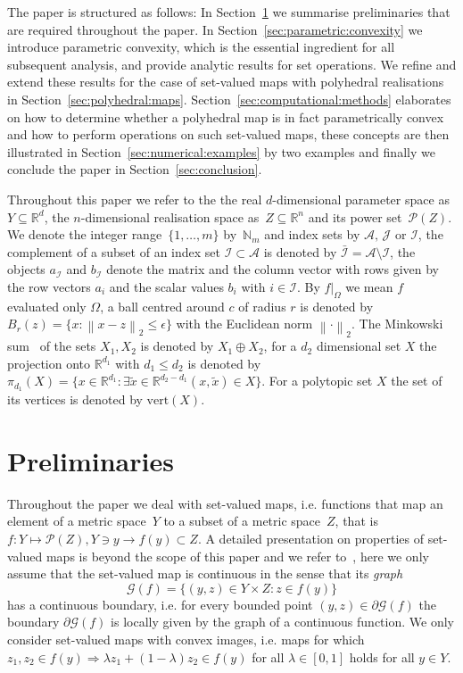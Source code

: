 \documentclass[smallextended]{svjour3}       %
\numberwithin{equation}{section}
\providecommand{\norm}[1]{\left\|#1\right\|}
\begin{document}
The paper is structured as follows:
%
In Section~\ref{sec:preliminaries} we summarise preliminaries that are
required throughout the paper. In
Section~\ref{sec:parametric:convexity} we introduce parametric
convexity, which is the essential ingredient for all subsequent
analysis, and provide analytic results for set operations. 
We refine and extend these results for the case of set-valued maps with polyhedral realisations in Section~\ref{sec:polyhedral:maps}.
%
Section~\ref{sec:computational:methods} elaborates on how to determine whether a polyhedral map is in fact parametrically convex and how to perform operations on such set-valued maps, these concepts are then illustrated in Section~\ref{sec:numerical:examples} by two examples and finally we conclude the paper in Section~\ref{sec:conclusion}.


Throughout this paper we refer to the the real $d$-dimensional parameter space as $Y\subseteq\mathbb R^d$, the $n$-dimensional realisation space as~$Z\subseteq\mathbb R^n$ and its power set~$\mathscr P(Z)$.
%
We denote the integer range~$\{1,\dots,m\}$ by~$\mathbb N_m$ and index sets by $\mathcal A,\,\mathcal J$ or $\mathcal I$, the complement of a subset of an index set $\mathcal I\subset\mathcal A$ is denoted by $\bar{\mathcal I}=\mathcal A\setminus\mathcal I$, the objects $a_{\mathcal I}$ and $b_{\mathcal I}$ denote the matrix and the column vector with rows given by the row vectors $a_i$ and the scalar values $b_i$ with $i\in\mathcal I$.
%
By $f\vert_\Omega$ we mean $f$ evaluated only $\Omega$, a ball centred around $c$ of radius $r$ is denoted by $B_r(z)=\{x:\norm{x-z}_2\leq\epsilon\}$ with the Euclidean norm $\norm{\cdot}_2$.
%
The Minkowski sum~\cite{Minkowski:1911} of the sets $X_1,X_2$ is denoted by $X_1\oplus X_2$, for a $d_2$ dimensional set $X$ the projection onto $\mathbb R^{d_1}$ with $d_1\leq d_2$ is denoted by $\pi_{d_1}(X) = \{x\in\mathbb R^{d_1}:\exists \tilde x\in\mathbb R^{d_2-d_1} (x,\tilde x)\in X\}$.
%
For a polytopic set $X$ the set of its vertices is denoted by $\text{vert}(X)$.
%
\section{Preliminaries}\label{sec:preliminaries}

Throughout the paper we deal with set-valued maps, i.e. functions that map an element of a metric space~$Y$ to a subset of a metric space~$Z$, that is $f:Y\mapsto\mathscr P(Z), Y\ni y\rightarrow f(y)\subset Z$. 
%
A detailed presentation on properties of set-valued maps is beyond the scope of this paper and we refer to~\cite{Aubin:2009}, here we only assume that the set-valued map is continuous in the sense that its \emph{graph}
%
\begin{equation}
  \mathscr G(f) = \{(y,z)\in Y\times Z: z\in f(y)\}
\end{equation}
%
has a continuous boundary, i.e. for every bounded point $(y,z)\in\partial\mathscr G(f)$ the boundary $\partial\mathscr G(f)$ is locally given by the graph of a continuous function.
%
We only consider set-valued maps with convex images, i.e. maps for which $z_1,z_2\in f(y)\Rightarrow \lambda z_1+(1-\lambda)z_2\in f(y)$ for all $\lambda\in[0,1]$ holds for all $y\in Y$.
\end{document}
